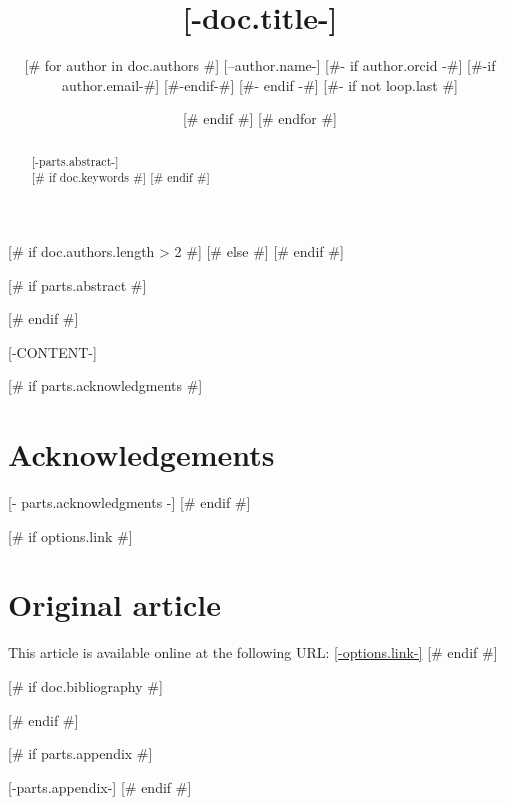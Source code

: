 \documentclass[runningheads]{llncs}
\begin{document}
\title{[-doc.title-]}



\author{
[# for author in doc.authors #]
	[--author.name-]
	[#- if author.orcid -#]
	\href{https://orcid.org/[-author.orcid-]}{\orcidicon}
	[#-if author.email-#]
	\href{[-author.email-]}{\Letter}
	[#-endif-#]	
	[#- endif -#]
	[#- if not loop.last #] \and [# endif #]
[# endfor #]
}


[# if doc.authors.length > 2 #]
[# else #]
[# endif #]

\maketitle

[# if parts.abstract #]
\begin{abstract}
[-parts.abstract-]\\

[# if doc.keywords #]
[# endif #]

\end{abstract}
[# endif #]



[-CONTENT-]

[# if parts.acknowledgments #]
\section*{Acknowledgements}
\footnotesize
[- parts.acknowledgments -]
\normalsize
[# endif #]

[# if options.link #]
\section*{Original article}
\footnotesize
This article is available online at the following URL: \href{[-options.link-]}{[-options.link-]}
\normalsize
[# endif #]

[# if doc.bibliography #]

[# endif #]



[# if parts.appendix #]
\clearpage

[-parts.appendix-]
[# endif #]
\end{document}
